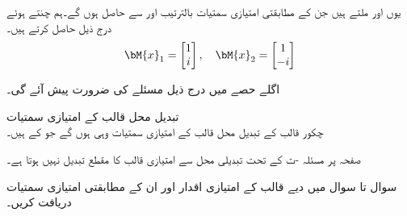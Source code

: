 یوں  اور  ملتے ہیں جن کے مطابقتی امتیازی سمتیات بالترتیب  اور  سے حاصل ہوں گے۔ہم  چنتے ہوئے درج ذیل حاصل کرتے ہیں۔
\begin{align*}
\bM{x}_1=\begin{bmatrix} 1\\i \end{bmatrix}, \quad \bM{x}_2=\begin{bmatrix} 1\\-i \end{bmatrix}
\end{align*}
 
اگلے حصے میں درج ذیل مسئلے کی ضرورت پیش آئے گی۔

\quad تبدیل محل قالب کے امتیازی سمتیات\\
چکور قالب  کے تبدیل محل قالب  کے امتیازی سمتیات وہی ہوں گے جو   کے ہیں۔ 

صفحہ  پر مسئلہ -ت کے تحت تبدیلی محل سے امتیازی قالب کا مقطع تبدیل نہیں ہوتا ہے۔ 

سوال  تا سوال  میں دیے قالب کے  امتیازی اقدار اور ان کے مطابقتی امتیازی سمتیات دریافت کریں۔

